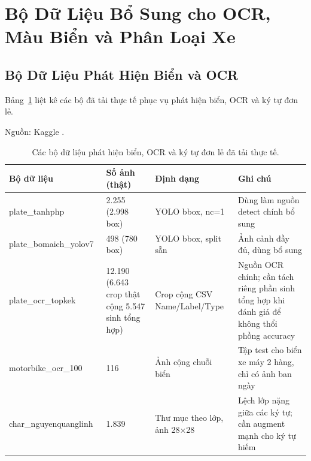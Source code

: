 \section{Bộ Dữ Liệu Bổ Sung cho OCR, Màu Biển và Phân Loại Xe}
\label{sec:datasetocrcolor}

\subsection{Bộ Dữ Liệu Phát Hiện Biển và OCR}

Bảng~\ref{tab:dataset-ocr} liệt kê các bộ đã tải thực tế phục vụ phát hiện biển, OCR và ký
tự đơn lẻ.

\begin{table}[htbp]
\centering
\caption{Các bộ dữ liệu phát hiện biển, OCR và ký tự đơn lẻ đã tải thực tế.}

{\footnotesize Nguồn: Kaggle \autocite{tanhphp2026vnplatedet,bomaich2022vnplateyolov7,topkek2024vnplateocr,dtkngan2024motorbikeocr,kaggle2022vncharplate}.}
\label{tab:dataset-ocr}
\small
\begin{tabular}{p{3.4cm} p{3.0cm} p{2.0cm} p{3.0cm}}
\toprule
\textbf{Bộ dữ liệu} & \textbf{Số ảnh (thật)} & \textbf{Định dạng} & \textbf{Ghi chú} \\
\midrule
plate\_tanhphp~\autocite{tanhphp2026vnplatedet} & 2.255 (2.998 box) & YOLO bbox, nc=1 & Dùng làm nguồn detect chính bổ sung \\
plate\_bomaich\_yolov7~\autocite{bomaich2022vnplateyolov7} & 498 (780 box) & YOLO bbox, split sẵn & Ảnh cảnh đầy đủ, dùng bổ sung \\
plate\_ocr\_topkek~\autocite{topkek2024vnplateocr} & 12.190 (6.643 crop thật cộng 5.547 sinh tổng hợp) & Crop cộng CSV Name/Label/Type & Nguồn OCR chính; cần tách riêng phần sinh tổng hợp khi đánh giá để không thổi phồng accuracy \\
motorbike\_ocr\_100~\autocite{dtkngan2024motorbikeocr} & 116 & Ảnh cộng chuỗi biển & Tập test cho biển xe máy 2 hàng, chỉ có ảnh ban ngày \\
char\_nguyenquanglinh~\autocite{kaggle2022vncharplate} & 1.839 & Thư mục theo lớp, ảnh 28$\times$28 & Lệch lớp nặng giữa các ký tự; cần augment mạnh cho ký tự hiếm \\
\bottomrule
\end{tabular}
\end{table}

